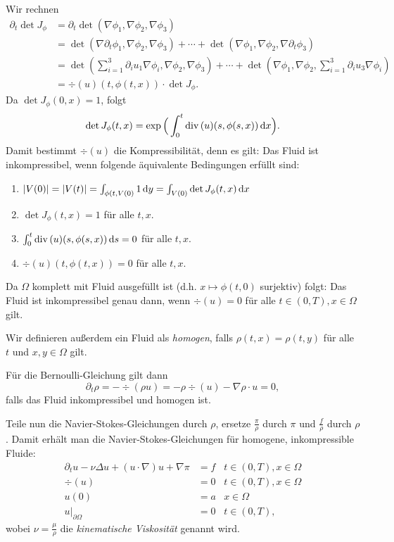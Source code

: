Wir rechnen
\begin{align*}
  \partial_t \det J_\phi
  &= \partial_t \det (\nabla \phi_1, \nabla \phi_2, \nabla \phi_3) \\
  &= \det (\nabla \partial_t \phi_1, \nabla \phi_2, \nabla \phi_3) + \cdots  +  \det(\nabla\phi_1, \nabla\phi_2, \nabla\partial_t \phi_3) \\
  &= \det( \sum_{i = 1}^3 \partial_i u_1 \nabla \phi_i, \nabla\phi_2, \nabla \phi_3) + \cdots + \det(\nabla\phi_1, \nabla\phi_2, \sum_{i = 1}^3 \partial_i u_3  \nabla \phi_i) \\
  &= \div(u)(t,\phi(t,x)) \cdot \det J_\phi.
\end{align*}
Da $\det J_\phi(0,x) = 1$, folgt 
$$
\det J_\phi(t,x) = \exp\Big( \int_0^t \mathrm{div\,} (u)(s,\phi(s,x))\, {\operatorname{d}\!{x}} \Big).
$$
Damit bestimmt $\div(u)$ die Kompressibilität, denn es gilt:
Das Fluid ist inkompressibel, wenn folgende äquivalente Bedingungen erfüllt sind:
\begin{enumerate}[1)]
  \item $|V(0)| = |V(t)| = \int_{\phi(t,V(0)} 1 \, {\operatorname{d}\!{y}} = \int_{V(0)} \det J_\phi(t,x) \, {\operatorname{d}\!{x}}$
  \item $\det J_\phi(t,x) = 1$ für alle $t, x$.
  \item $\int_0^t \mathrm{div\,} (u)(s,\phi(s,x)) \, {\operatorname{d}\!{s}} = 0$ für alle $t,x$.
  \item $\div(u)(t,\phi(t,x)) = 0$ für alle $t,x$.
\end{enumerate}
Da $\Omega$ komplett mit Fluid ausgefüllt ist (d.h. $x \mapsto \phi(t,0)$ surjektiv) folgt: Das Fluid ist inkompressibel genau dann, wenn $\div(u) = 0$ für alle $t \in (0,T), x \in \Omega$ gilt.

Wir definieren außerdem ein Fluid als \emph{homogen}, falls $\rho(t,x) = \rho(t,y)$ für alle $t$ und $x,y \in \Omega$ gilt.

Für die Bernoulli-Gleichung gilt dann
$$
\partial_t \rho = -\div(\rho u) = -\rho \div(u) - \nabla \rho \cdot u = 0,
$$
falls das Fluid inkompressibel und homogen ist.

Teile nun die Navier-Stokes-Gleichungen durch $\rho$, ersetze $\frac{\pi}{\rho}$ durch $\pi$ und $\frac{f}{\rho}$ durch $\rho$.
Damit erhält man die Navier-Stokes-Gleichungen für homogene, inkompressible Fluide:
\begin{align*}
  \partial_t u - \nu \Delta u + (u \cdot \nabla) u + \nabla \pi &= f &t \in (0,T), x \in \Omega \\
  \div(u) &= 0 &t \in (0,T), x \in \Omega\\
  u(0) &= a &x \in \Omega \\
  u|_{\partial\Omega} &= 0  &t \in (0,T),
\end{align*}
wobei $\nu = \frac{\mu}{\rho}$ die \emph{kinematische Viskosität} genannt wird.

